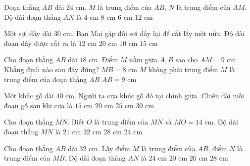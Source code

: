 \begin{ex} %
Đoạn thẳng $AB$ dài $24\text{ cm}$. $M$ là trung điểm của $AB$, $N$ là trung điểm của $AM$. Độ dài đoạn thẳng $AN$ là
\choice
{$4\text{ cm}$}
{$8\text{ cm}$}
{\True $6\text{ cm}$}
{$12\text{ cm}$}
\end{ex}

\begin{ex} %
Một sợi dây dài $30\text{ cm}$. Bạn Mai gập đôi sợi dây lại để cắt lấy một nửa. Độ dài đoạn dây được cắt ra là
\choice
{$12\text{ cm}$}
{$20\text{ cm}$}
{$10\text{ cm}$}
{\True $15\text{ cm}$}
\end{ex}

\begin{ex} %
Cho đoạn thẳng $AB$ dài $18\text{ cm}$. Điểm $M$ nằm giữa $A, B$ sao cho $AM = 9\text{ cm}$. Khẳng định nào sau đây đúng?
\choice
{$MB = 8\text{ cm}$}
{$M$ không phải trung điểm}
{\True $M$ là trung điểm của đoạn thẳng $AB$}
{$AB = 9\text{ cm}$}
\end{ex}

\begin{ex} %
Một khúc gỗ dài $40\text{ cm}$. Người ta cưa khúc gỗ đó tại chính giữa. Chiều dài mỗi đoạn gỗ sau khi cưa là
\choice
{$15\text{ cm}$}
{\True $20\text{ cm}$}
{$25\text{ cm}$}
{$30\text{ cm}$}
\end{ex}

\begin{ex} %
Cho đoạn thẳng $MN$. Biết $O$ là trung điểm của $MN$ và $MO = 14\text{ cm}$. Độ dài đoạn thẳng $MN$ là
\choice
{$21\text{ cm}$}
{$32\text{ cm}$}
{\True $28\text{ cm}$}
{$24\text{ cm}$}
\end{ex}

\begin{ex} %
Cho đoạn thẳng $AB$ dài $32\text{ cm}$. Lấy điểm $M$ là trung điểm của $AB$, điểm $N$ là trung điểm của $MB$. Độ dài đoạn thẳng $AN$ là
\choice
{\True $24\text{ cm}$}
{$20\text{ cm}$}
{$26\text{ cm}$}
{$28\text{ cm}$}
\end{ex}


